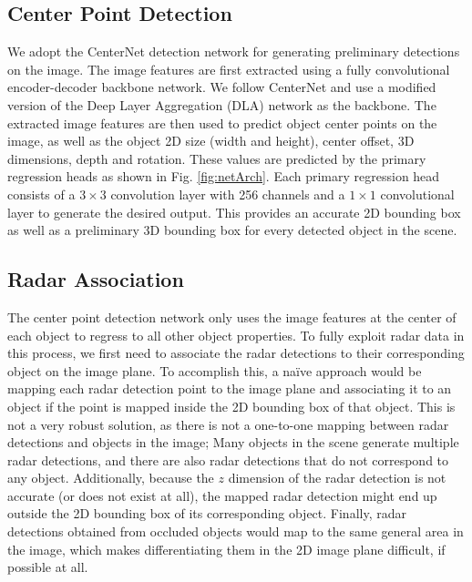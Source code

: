 \documentclass[10pt,twocolumn,letterpaper]{article}
\begin{document}
   \subsection{Center Point Detection}
   We adopt the CenterNet \cite{zhou2019objects} detection network for generating
   preliminary detections on the image. The image features are first extracted 
   using a fully convolutional encoder-decoder backbone network. We follow 
   CenterNet \cite{zhou2019objects} and use a modified version of the Deep Layer
   Aggregation (DLA) network \cite{yuDeepLayerAggregation2018} as the backbone.
   The extracted image features are then used
   to predict object center points on the image, as well as
   the object 2D size (width and height), center offset, 3D dimensions, depth 
   and rotation. These values are predicted by the primary regression heads as shown 
   in Fig. \ref{fig:netArch}. Each primary regression head consists of a $3\times3$ 
   convolution layer with 256 channels and a $1\times1$ convolutional layer to 
   generate the desired output. This provides an accurate 2D bounding box as well 
   as a preliminary 3D bounding box for every detected object in the scene.
   
   
   \subsection{Radar Association}
   
   The center point detection network only uses the image features at the center
   of each object to regress to all other object properties.
   To fully exploit radar data in this process, we first need to associate the radar 
   detections to their corresponding object on the image plane. To accomplish 
   this, a na\"{i}ve approach would be mapping each radar detection point to the 
   image plane and associating it to an object if the point is mapped inside 
   the 2D bounding box of that object. This is not a very robust solution, as 
   there is not a one-to-one mapping between radar detections and objects
   in the image; Many objects in the scene generate multiple radar 
   detections, and there are also radar detections that do not correspond to 
   any object.
   Additionally, because the $z$ dimension of the radar detection is not accurate
   (or does not exist at all), the mapped radar detection might end up outside 
   the 2D bounding box of its corresponding object. Finally, radar detections
   obtained from occluded objects would map to the same general area in the 
   image, which makes differentiating them in the 2D image plane difficult, 
   if possible at all. 
   
\end{document}
